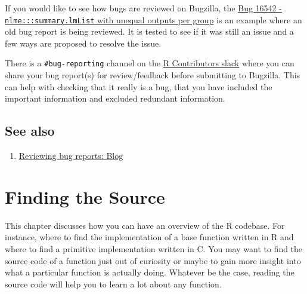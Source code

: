 \documentclass[
  letterpaper,
  DIV=11,
  numbers=noendperiod]{scrreprt}
\providecommand{\tightlist}{%
  \setlength{\itemsep}{0pt}\setlength{\parskip}{0pt}}\usepackage{longtable,booktabs,array}
\begin{document}
If you would like to see how bugs are reviewed on Bugzilla, the
\href{https://bugs.r-project.org/bugzilla/show_bug.cgi?id=16542}{Bug
16542 - \texttt{nlme:::summary.lmList} with unequal outputs per group}
is an example where an old bug report is being reviewed. It is tested to
see if it was still an issue and a few ways are proposed to resolve the
issue.

\begin{tcolorbox}[enhanced jigsaw, coltitle=black, rightrule=.15mm, opacityback=0, left=2mm, colframe=quarto-callout-note-color-frame, toprule=.15mm, bottomtitle=1mm, toptitle=1mm, bottomrule=.15mm, breakable, colbacktitle=quarto-callout-note-color!10!white, titlerule=0mm, leftrule=.75mm, title=\textcolor{quarto-callout-note-color}{\faInfo}\hspace{0.5em}{Note}, opacitybacktitle=0.6, colback=white, arc=.35mm]

There is a \texttt{\#bug-reporting} channel on the
\href{https://r-contributors.slack.com/}{R Contributors slack} where you
can share your bug report(s) for review/feedback before submitting to
Bugzilla. This can help with checking that it really is a bug, that you
have included the important information and excluded redundant
information.

\end{tcolorbox}

\section{See also}\label{see-also-2}

\begin{enumerate}
\def\labelenumi{\arabic{enumi}.}
\tightlist
\item
  \href{https://blog.r-project.org/2019/10/09/r-can-use-your-help-reviewing-bug-reports/index.html}{Reviewing
  bug reports: Blog}
\end{enumerate}


\chapter{Finding the Source}\label{FindSource}

This chapter discusses how you can have an overview of the R codebase.
For instance, where to find the implementation of a base function
written in R and where to find a primitive implementation written in C.
You may want to find the source code of a function just out of curiosity
or maybe to gain more insight into what a particular function is
actually doing. Whatever be the case, reading the source code will help
you to learn a lot about any function.
\end{document}
